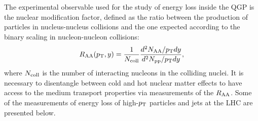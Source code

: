 The experimental observable used for the study of energy loss inside the QGP is the nuclear modification factor, defined as the ratio between the production of particles in nucleus-nucleus collisions and the one expected according to the binary scaling in nucleon-nucleon collisions:
\begin{equation}
\label{eq:Raa}
R_{\rm AA} (p_{\rm T}, y) = \frac{1}{N_{\rm coll}}\frac{d^2N_{\rm AA}/p_{\rm T} dy}{d^2N_{\rm pp}/p_{\rm T} dy},
\end{equation}
where $N_{\rm coll}$ is the number of interacting nucleons in the colliding nuclei.
It is necessary to disentangle between cold and hot nuclear matter effects to have access to the medium transport properties via measurements of the $R_{\rm AA}$. Some of the measurements of energy loss of high-$p_{\rm T}$ particles and jets at the LHC are presented below.

